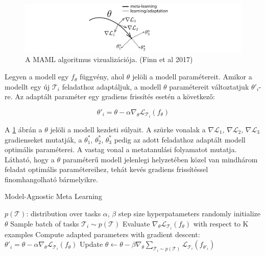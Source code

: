 \begin{figure}[!ht]
	\centering
	\includegraphics[width=200mm, keepaspectratio]{figures/maml.png}
	\caption{A MAML algoritmus vizualizációja. (Finn et al 2017)}
	\label{fig:maml}
\end{figure}

Legyen a modell egy $f_\theta$ függvény, ahol $\theta$ jelöli a modell paramétereit. Amikor a modellt egy új $\mathcal{T}_i$ feladathoz adaptáljuk, a modell $\theta$ paramétereit változtatjuk $\theta'_i$-re. Az adaptált paraméter egy gradiens frissítés esetén a következő:

\begin{equation} \label{eq:1}
\theta'_i = \theta - \alpha\nabla_{\theta}\mathcal{L}_{\mathcal{T}_i}(f_{\theta})
\end{equation}

A \ref{fig:maml} ábrán a $\theta$ jelöli a modell kezdeti súlyait. A szürke vonalak a $\nabla\mathcal{L}_1$, $\nabla\mathcal{L}_2$, $\nabla\mathcal{L}_3$ gradienseket
mutatják, a $\theta^*_1$, $\theta^*_2$, $\theta^*_3$ pedig az adott feladathoz adaptált modell optimális paraméterei. A vastag vonal a metatanulási folyamatot mutatja. Látható, hogy a $\theta$ paraméterű modell jelenlegi helyzetében közel van mindhárom feladat optimális paramétereihez, tehát kevés gradiens frissítéssel finomhangolható bármelyikre.

\begin{algorithm}
	\caption{Model-Agnostic Meta Learning}
	\label{fig:maml-pseudo}
	\begin{algorithmic}[1]
		\Require $p(\mathcal{T})$: distribution over tasks
		\Require $\alpha$, $\beta$ step size hyperpatameters
		\State randomly initialize $\theta$
		\State Sample batch of tasks $\mathcal{T}_i \sim p(\mathcal{T})$
		\State Evaluate $\nabla_{\theta}\mathcal{L}_{\mathcal{T}_i}(f_{\theta})$ with respect to K examples
		\State Compute adapted parameters with gradient descent: $\theta'_i = \theta - \alpha\nabla_{\theta}\mathcal{L}_{\mathcal{T}_i}(f_{\theta})$
		\EndFor
		\State Update $\theta \gets \theta - \beta\nabla_{\theta}\sum_{\mathcal{T}_i\sim p(\mathcal{T})}\mathcal{L}_{\mathcal{T}_i} (f_{\theta'_i})$
		\EndWhile
	\end{algorithmic}
\end{algorithm}

